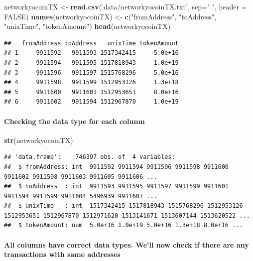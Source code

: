 \documentclass[]{article}
\newenvironment{Shaded}{\begin{snugshade}}{\end{snugshade}}
\newcommand{\KeywordTok}[1]{\textcolor[rgb]{0.13,0.29,0.53}{\textbf{#1}}}
\newcommand{\DataTypeTok}[1]{\textcolor[rgb]{0.13,0.29,0.53}{#1}}
\newcommand{\StringTok}[1]{\textcolor[rgb]{0.31,0.60,0.02}{#1}}
\newcommand{\OtherTok}[1]{\textcolor[rgb]{0.56,0.35,0.01}{#1}}
\newcommand{\NormalTok}[1]{#1}
\let\oldparagraph\paragraph
\renewcommand{\paragraph}[1]{\oldparagraph{#1}\mbox{}}
\begin{document}
\begin{Shaded}
\begin{Highlighting}[]
\NormalTok{networkyocoinTX <-}\StringTok{ }\KeywordTok{read.csv}\NormalTok{(}\StringTok{'data/networkyocoinTX.txt'}\NormalTok{, }\DataTypeTok{sep=}\StringTok{" "}\NormalTok{, }\DataTypeTok{header =} \OtherTok{FALSE}\NormalTok{)}
\KeywordTok{names}\NormalTok{(networkyocoinTX) <-}\StringTok{ }\KeywordTok{c}\NormalTok{(}\StringTok{"fromAddress"}\NormalTok{, }\StringTok{"toAddress"}\NormalTok{, }\StringTok{"unixTime"}\NormalTok{, }\StringTok{"tokenAmount"}\NormalTok{)}
\KeywordTok{head}\NormalTok{(networkyocoinTX)}
\end{Highlighting}
\end{Shaded}

\begin{verbatim}
##   fromAddress toAddress   unixTime tokenAmount
## 1     9911592   9911593 1517342415     5.0e+16
## 2     9911594   9911595 1517818943     1.0e+19
## 3     9911596   9911597 1515768296     5.0e+16
## 4     9911598   9911599 1512953126     1.3e+18
## 5     9911600   9911601 1512953651     8.0e+16
## 6     9911602   9911594 1512967870     1.0e+19
\end{verbatim}

\paragraph{Checking the data type for each
column}\label{checking-the-data-type-for-each-column-1}

\begin{Shaded}
\begin{Highlighting}[]
\KeywordTok{str}\NormalTok{(networkyocoinTX)}
\end{Highlighting}
\end{Shaded}

\begin{verbatim}
## 'data.frame':    746397 obs. of  4 variables:
##  $ fromAddress: int  9911592 9911594 9911596 9911598 9911600 9911602 9911598 9911603 9911605 9911606 ...
##  $ toAddress  : int  9911593 9911595 9911597 9911599 9911601 9911594 9911599 9911604 5496939 9911607 ...
##  $ unixTime   : int  1517342415 1517818943 1515768296 1512953126 1512953651 1512967870 1512971620 1513141671 1513607144 1513620522 ...
##  $ tokenAmount: num  5.0e+16 1.0e+19 5.0e+16 1.3e+18 8.0e+16 ...
\end{verbatim}

\paragraph{All columns have correct data types. We'll now check if there
are any transactions with same
addresses}\label{all-columns-have-correct-data-types.-well-now-check-if-there-are-any-transactions-with-same-addresses-1}
\end{document}
